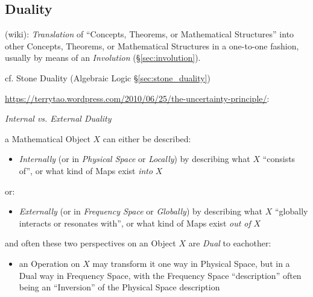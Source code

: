 \subsection{Duality}\label{sec:duality}

(wiki): \emph{Translation} of ``Concepts, Theorems, or Mathematical
Structures'' into other Concepts, Theorems, or Mathematical Structures in a
one-to-one fashion, usually by means of an \emph{Involution}
(\S\ref{sec:involution}).

cf. Stone Duality (Algebraic Logic \S\ref{sec:stone_duality})

\url{https://terrytao.wordpress.com/2010/06/25/the-uncertainty-principle/}:

\emph{Internal vs. External Duality}

a Mathematical Object $X$ can either be described:
\begin{itemize}
\item \emph{Internally} (or in \emph{Physical Space} or \emph{Locally}) by
  describing what $X$ ``consists of'', or what kind of Maps exist \emph{into}
  $X$
\end{itemize}
or:
\begin{itemize}
\item \emph{Externally} (or in \emph{Frequency Space} or \emph{Globally}) by
  describing what $X$ ``globally interacts or resonates with'', or what kind of
  Maps exist \emph{out of} $X$
\end{itemize}
and often these two perspectives on an Object $X$ are \emph{Dual} to eachother:
\begin{itemize}
\item an Operation on $X$ may transform it one way in Physical Space, but in a
  Dual way in Frequency Space, with the Frequency Space ``description'' often
  being an ``Inversion'' of the Physical Space description
\end{itemize}

